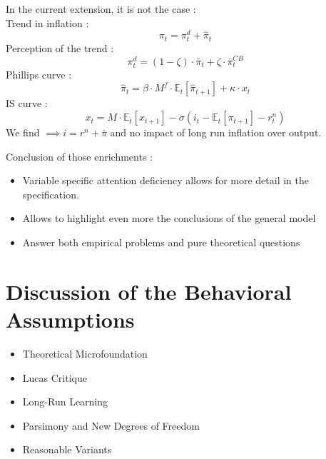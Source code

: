\documentclass{beamer}
\newcommand\ReduceFont{\fontsize{10}{7.2}\selectfont}
\begin{document}
\begin{frame}{\subsecname}
    In the current extension, it is not the case : \\
    Trend in inflation :
    \begin{equation*}
        {\pi}_{t}=\pi^{d}_{t}+\hat{\pi}_{t}
    \end{equation*}
    Perception of the trend :
    \begin{equation}\tag{59}
        \pi^{d}_{t}=(1-\zeta)\cdot\bar{\pi}_{t}+\zeta\cdot\bar{\pi}_{t}^{CB}
    \end{equation}
    Phillips curve :
    \begin{equation}\tag{61}
        \hat{\pi}_{t}=\beta\cdot M^{f}\cdot\mathbb{E}_t\left[\hat{\pi}_{t+1}\right]+\kappa\cdot x_{t}
    \end{equation}
    IS curve :
    \begin{equation}\tag{60}
        x_{t}=M\cdot\mathbb{E}_{t}\left[x_{t+1}\right]-\sigma\left(i_{t}-\mathbb{E}_{t}\left[\pi_{t+1}\right]-r^{n}_{t}\right)
    \end{equation}
    We find $\implies i=r^{n}+\bar{\pi}$ and no impact of long run inflation over output.
\end{frame}

\begin{frame}
    Conclusion of those enrichments :
    \begin{itemize}
        \item Variable specific attention deficiency allows for more detail in the specification.
        \item Allows to highlight even more the conclusions of the general model
        \item Answer both empirical problems and pure theoretical questions
    \end{itemize}
\end{frame}

\section{Discussion of the Behavioral Assumptions}
\begin{frame}
    \ReduceFont
\end{frame}

\begin{frame}
    \begin{itemize}
        \item Theoretical Microfoundation
        \item Lucas Critique
        \item Long-Run Learning
        \item Parsimony and New Degrees of Freedom
        \item Reasonable Variants
    \end{itemize}
\end{frame}
\end{document}
